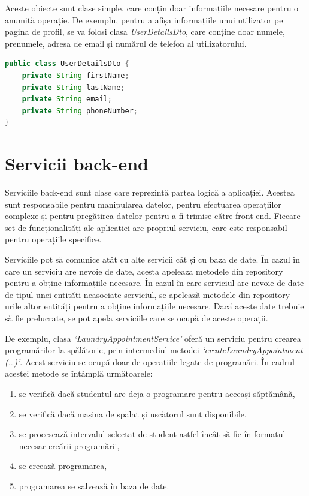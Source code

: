 \documentclass[12pt,a4paper]{report}
\theoremstyle{definition}
\theoremstyle{remark}
\begin{document}
\par Aceste obiecte sunt clase simple, care conțin doar informațiile necesare pentru o anumită operație. De exemplu, pentru a afișa informațiile unui utilizator pe pagina de profil, se va folosi clasa \textit{UserDetailsDto}, care conține doar numele, prenumele, adresa de email și numărul de telefon al utilizatorului.

\begin{lstlisting}[language=Java, caption={Clasa UserDetailsDto}]
public class UserDetailsDto {
    private String firstName;
    private String lastName;
    private String email;
    private String phoneNumber;
}
\end{lstlisting}

\section{Servicii back-end}
\par Serviciile back-end sunt clase care reprezintă partea logică a aplicației. Acestea sunt responsabile pentru manipularea datelor, pentru efectuarea operațiilor complexe și pentru pregătirea datelor pentru a fi trimise către front-end. Fiecare set de funcționalități ale aplicației are propriul serviciu, care este responsabil pentru operațiile specifice.

\par Serviciile pot să comunice atât cu alte servicii cât și cu baza de date. În cazul în care un serviciu are nevoie de date, acesta apelează metodele din repository pentru a obține informațiile necesare. În cazul în care serviciul are nevoie de date de tipul unei entități neasociate serviciul, se apelează metodele din repository-urile altor entități pentru a obține informațiile necesare. Dacă aceste date trebuie să fie prelucrate, se pot apela serviciile care se ocupă de aceste operații.

\par De exemplu, clasa \textit{`LaundryAppointmentService'} oferă un serviciu pentru crearea programărilor la spălătorie, prin intermediul metodei \textit{`createLaundryAppointment (\ldots)'}. Acest serviciu se ocupă doar de operațiile legate de programări. În cadrul acestei metode se întâmplă următoarele:

\begin{enumerate}
    \item se verifică dacă studentul are deja o programare pentru aceeași săptămână,
    \item se verifică dacă mașina de spălat și uscătorul sunt disponibile,
    \item se procesează intervalul selectat de student astfel încât să fie în formatul necesar creării programării,
    \item se creează programarea,
    \item programarea se salvează în baza de date.
\end{enumerate}
\end{document}

